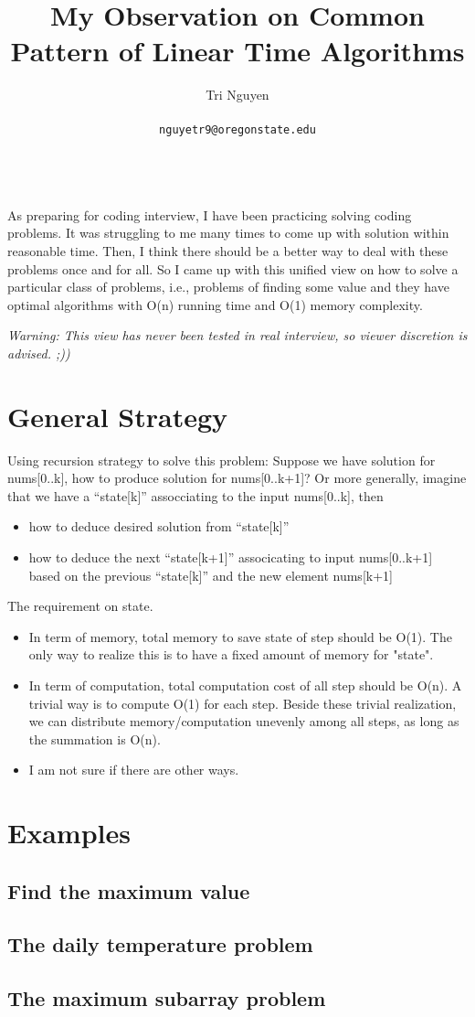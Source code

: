 \documentclass[11pt,a4paper]{article}
\title{My Observation on Common Pattern of Linear Time Algorithms}
\author{	Tri Nguyen \\\\
        \texttt{nguyetr9@oregonstate.edu} \\\\
        }
\begin{document}
\maketitle
As preparing for coding interview, I have been practicing solving coding problems. It was struggling to me many times to come up with solution within reasonable time. Then, I think there should be a better way to deal with these problems once and for all. So I came up with this unified view on how to solve a particular class of problems, i.e., problems of finding some value and they have optimal algorithms with O(n) running time and O(1) memory complexity.

\textit{Warning: This view has never been tested in real interview, so viewer discretion is advised. ;))}

\section{General Strategy}%
\label{sec:general_strategy}
Using recursion strategy to solve this problem:
Suppose we have solution for nums[0..k], how to produce solution for nums[0..k+1]? Or more generally, imagine that we have a ``state[k]'' assocciating to the input nums[0..k], then
\begin{itemize}
    \item how to deduce desired solution from ``state[k]''
    \item how to deduce the next ``state[k+1]'' associcating to input nums[0..k+1] based on the previous ``state[k]'' and the new element nums[k+1]
\end{itemize}
The requirement on state.
\begin{itemize}
    \item In term of memory, total memory to save state of step should be O(1). The only way to realize this is to have a fixed amount of memory for "state".
    \item In term of computation, total computation cost of all step should be O(n). A trivial way is to compute O(1) for each step. Beside these trivial realization, we can distribute memory/computation unevenly among all steps, as long as the summation is O(n).
    \item I am not sure if there are other ways.
\end{itemize}

\section{Examples}%
\label{sec:examples}

\subsection{Find the maximum value}%
\label{sub:the_maximum_problem}

\subsection{The daily temperature problem}%
\label{sub:the_daily_temperature_problem}

\subsection{The maximum subarray problem}%
\label{sub:the_maximum_subarray_problem}
\end{document}
